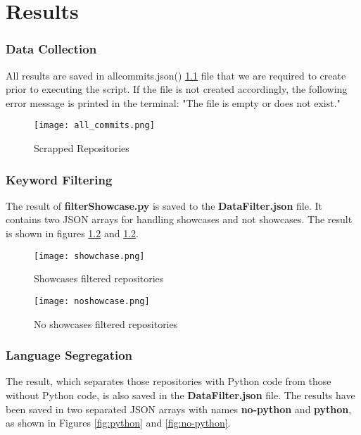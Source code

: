\chapter{Results}\label{chap:results}

\subsection{Data Collection}

All results are saved in allcommits.json() \ref{fig:all-commits} file that we are required to create prior to executing the script. 
If the file is not created accordingly, the following error message is printed in the terminal: "The file is empty or does not exist."
\begin{figure}
    \centering
    \texttt{[image: all\_commits.png]}
    \caption{Scrapped Repositories}
    \label{fig:all-commits}
\end{figure}


\subsection{Keyword Filtering}

The result of \textbf{filterShowcase.py} is saved to the \textbf{DataFilter.json} file. It contains two JSON arrays for handling showcases and not showcases. The result is shown in figures \ref{fig:showcases_filtered} and \ref{fig:showcases_filtered}.

\begin{figure}
    \centering
    \texttt{[image: showchase.png]}
    \caption{Showcases filtered repositories}
    \label{fig:showcases_filtered}
\end{figure}

\begin{figure}
    \centering
    \texttt{[image: noshowcase.png]}
    \caption{No showcases filtered repositories}
    \label{fig:noshowcases_filtered}
\end{figure}

\subsection{Language Segregation}

The result, which separates those repositories with Python code from those without Python code, is also saved in the \textbf{DataFilter.json} file. 
The results have been saved in two separated JSON arrays with names \textbf{no-python} and \textbf{python}, as shown in Figures \ref{fig:python} and \ref{fig:no-python}.

